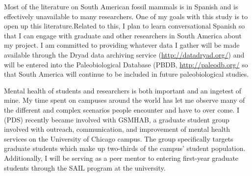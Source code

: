 \documentclass[11pt,letterpaper]{article}
\begin{document}
Most of the literature on South American fossil mammals is in Spanish and is effectively unavailable to many researchers. One of my goals with this study is to open up this literature.Related to this, I plan to learn conversational Spanish so that I can engage with graduate and other researchers in South America about my project. I am committed to providing whatever data I gather will be made available through the Dryad data archiving service (\url{http://datadryad.org/}) and will be entered into the Paleobiological Database (PBDB, \url{http://paleodb.org/} so that South America will continue to be included in future paleobiological studies. 

Mental health of students and researchers is both important and an ingetest of mine. My time spent on campuses around the world has let me observe many of the different and complex scenarios people encounter and have to over come. I (PDS) recently became involved with GSMHAB, a graduate student group involved with outreach, communication, and improvement of mental health services on the University of Chicago campus. The group specifically targets graduate students which make up two-thirds of the campus' student population. Additionally, I will be serving as a peer mentor to entering first-year graduate students through the SAIL program at the university.




\end{document}
